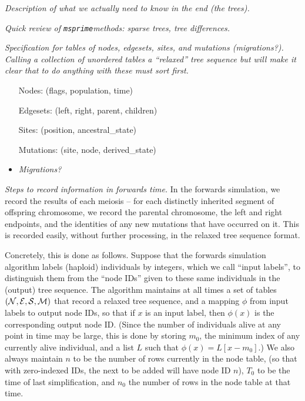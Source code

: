 \documentclass{article}
\newcommand{\msprime}{\texttt{msprime}}
\newcommand{\plr}[1]{{\em \color{blue} #1}}
\begin{document}
\plr{Description of what we actually need to know in the end (the trees).}

\plr{Quick review of \msprime methods: sparse trees, tree differences.}

\plr{Specification for tables of nodes, edgesets, sites, and mutations (migrations?).}
\plr{Calling a collection of unordered tables a ``relaxed'' tree sequence
    but will make it clear that to do anything with these must sort first.}

\begin{itemize}
    \item[Nodes:]
        (flags, population, time)
    \item[Edgesets:]
        (left,  right,  parent,  children)
    \item[Sites:]
        (position,  ancestral\_state)
    \item[Mutations:]
        (site,  node,  derived\_state)
    \item \plr{Migrations?}
\end{itemize}


\plr{Steps to record information in forwards time.}
In the forwards simulation,
we record the results of each meiosis --
for each distinctly inherited segment of offspring chromosome,
we record the parental chromosome,
the left and right endpoints,
and the identities of any new mutations that have occurred on it.
This is recorded easily, without further processing,
in the relaxed tree sequence format.

Concretely, this is done as follows.
Suppose that the forwards simulation algorithm labels (haploid) individuals by integers,
which we call ``input labels'', 
to distinguish them from the ``node IDs'' given to these same individuals in the (output) tree sequence.
The algorithm maintains at all times a set of tables $(\mathcal{N}, \mathcal{E}, \mathcal{S}, \mathcal{M})$
that record a relaxed tree sequence,
and a mapping $\phi$ from input labels to output node IDs, so that if $x$ is an input label,
then $\phi(x)$ is the corresponding output node ID.
(Since the number of individuals alive at any point in time may be large,
this is done by storing $m_0$, the minimum index of any currently alive individual,
and a list $L$ such that $\phi(x) = L[x-m_0]$.)
We also always maintain $n$ to be the number of rows currently in the node table,
(so that with zero-indexed IDs, the next to be added will have node ID $n$),
$T_0$ to be the time of last simplification,
and $n_0$ the number of rows in the node table at that time. 
\end{document}
